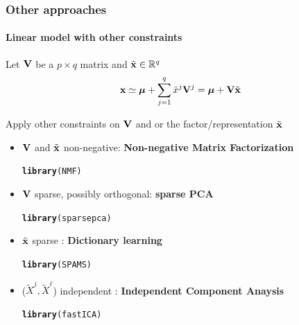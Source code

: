 \documentclass{beamer}\usepackage[]{graphicx}\usepackage[]{color}
\makeatletter
\newcommand{\hlstd}[1]{\textcolor[rgb]{0.345,0.345,0.345}{#1}}%
\newcommand{\hlkwd}[1]{\textcolor[rgb]{0.737,0.353,0.396}{\textbf{#1}}}%
\newenvironment{kframe}{%
 \def\at@end@of@kframe{}%
 \ifinner\ifhmode%
  \def\at@end@of@kframe{\end{minipage}}%
  \begin{minipage}{\columnwidth}%
 \fi\fi%
 \def\FrameCommand##1{\hskip\@totalleftmargin \hskip-\fboxsep
 \colorbox{shadecolor}{##1}\hskip-\fboxsep
     \hskip-\linewidth \hskip-\@totalleftmargin \hskip\columnwidth}%
 \MakeFramed {\advance\hsize-\width
   \@totalleftmargin\z@ \linewidth\hsize
   \@setminipage}}%
 {\par\unskip\endMakeFramed%
 \at@end@of@kframe}
\newenvironment{knitrout}{}{} %
\makeatother
\begin{document}
\begin{frame}
  \frametitle{Other approaches}
  \framesubtitle{Linear model with other constraints}
    
    Let $\mathbf{V}$ be a $p\times q$ matrix and $\tilde {\mathbf{x}} \in \mathbb{R}^q$
    \begin{equation*}
      \mathbf{x} \simeq  \boldsymbol{\mu} + \sum_{j=1}^q \tilde x^j \mathbf{V}^j = \boldsymbol{\mu} + \mathbf{V} \tilde{\mathbf{x}}
    \end{equation*}
  
    Apply other constraints on $\mathbf{V}$ and or the factor/representation $\tilde{\mathbf{x}}$
    \begin{itemize}
      \item $\mathbf{V}$ and $\tilde{\mathbf{x}}$ non-negative: \alert{\bf Non-negative Matrix Factorization}\\
\begin{knitrout}\scriptsize
{}\color{fgcolor}\begin{kframe}
\begin{alltt}
\hlkwd{library}\hlstd{(NMF)}
\end{alltt}
\end{kframe}
\end{knitrout}
      \item $\mathbf{V}$ sparse, possibly orthogonal: \alert{\bf sparse PCA}\\
\begin{knitrout}\scriptsize
{}\color{fgcolor}\begin{kframe}
\begin{alltt}
\hlkwd{library}\hlstd{(sparsepca)}
\end{alltt}
\end{kframe}
\end{knitrout}
      \item $\tilde {\mathbf{x}}$ sparse : \alert{\bf Dictionary learning}
\begin{knitrout}\scriptsize
{}\color{fgcolor}\begin{kframe}
\begin{alltt}
\hlkwd{library}\hlstd{(SPAMS)}
\end{alltt}
\end{kframe}
\end{knitrout}
      \item ($\tilde X^j, \tilde X^\ell$) independent : \alert{\bf Independent Component Anaysis}
\begin{knitrout}\scriptsize
{}\color{fgcolor}\begin{kframe}
\begin{alltt}
\hlkwd{library}\hlstd{(fastICA)}
\end{alltt}
\end{kframe}
\end{knitrout}
    \end{itemize}

\end{frame}
 
\end{document}
